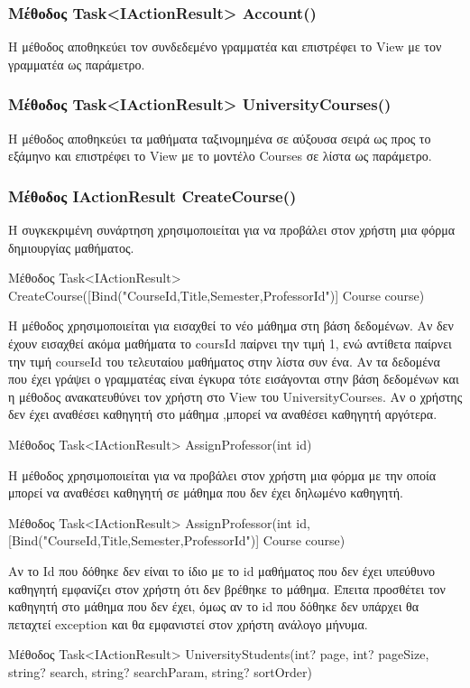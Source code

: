 \documentclass[12pt]{article}
\begin{document}
	\subsubsection{Μέθοδος Task<IActionResult> Account()}
	Η μέθοδος αποθηκεύει τον συνδεδεμένο γραμματέα και επιστρέφει το View με τον γραμματέα ως παράμετρο.
	
	\subsubsection{Μέθοδος Task<IActionResult> UniversityCourses()}
	Η μέθοδος αποθηκεύει τα μαθήματα ταξινομημένα σε αύξουσα σειρά ως προς το εξάμηνο και επιστρέφει το View με το μοντέλο Courses σε λίστα ως παράμετρο.
	
	\subsubsection{Μέθοδος IActionResult CreateCourse()}
	Η συγκεκριμένη συνάρτηση χρησιμοποιείται για να προβάλει στον χρήστη μια φόρμα δημιουργίας μαθήματος.


	Μέθοδος Task<IActionResult> CreateCourse([Bind("CourseId,Title,Semester,ProfessorId")] Course course)
	
	Η μέθοδος χρησιμοποιείται για εισαχθεί το νέο μάθημα στη βάση δεδομένων. Αν δεν έχουν εισαχθεί ακόμα μαθήματα το coursId παίρνει την τιμή 1, ενώ αντίθετα παίρνει την τιμή courseId του τελευταίου μαθήματος στην λίστα συν ένα. Αν τα δεδομένα που έχει γράψει ο γραμματέας είναι έγκυρα τότε εισάγονται στην βάση δεδομένων και η μέθοδος ανακατευθύνει τον χρήστη στο View του UniversityCourses. Αν ο χρήστης δεν έχει αναθέσει καθηγητή στο μάθημα ,μπορεί να αναθέσει καθηγητή αργότερα.
	
	
	Μέθοδος Task<IActionResult> AssignProfessor(int id)

	Η μέθοδος χρησιμοποιείται για να προβάλει στον χρήστη μια φόρμα με την οποία μπορεί να αναθέσει καθηγητή σε μάθημα που δεν έχει δηλωμένο καθηγητή.
	
	
	Μέθοδος Task<IActionResult> AssignProfessor(int id, [Bind("CourseId,Title,Semester,ProfessorId")] Course course)
	
	Αν το Id που δόθηκε δεν είναι το ίδιο με το id μαθήματος που δεν έχει υπεύθυνο καθηγητή  εμφανίζει στον χρήστη ότι δεν βρέθηκε το μάθημα. Έπειτα προσθέτει τον καθηγητή στο μάθημα που δεν έχει, όμως αν το id που δόθηκε δεν υπάρχει θα πεταχτεί exception και θα εμφανιστεί στον χρήστη ανάλογο μήνυμα.
	
	
	Μέθοδος Task<IActionResult> UniversityStudents(int? page, int? pageSize, string? search, string? searchParam, string? sortOrder)
	
\end{document}
